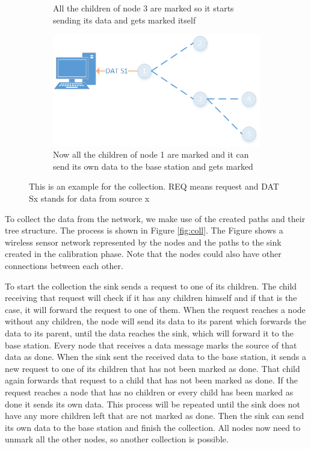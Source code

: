 \begin{figure}[htbp]
\begin{subfigure}[t]{0.4\textwidth}
        \caption{All the children of node 3 are marked so it starts sending its data and gets marked itself}
        \label{fig:coll8}
    \end{subfigure}
    \quad
    \quad
    \begin{subfigure}[t]{0.4\textwidth}
		\centering         
        \includegraphics[scale=0.6]{content/images/Collection/Part9}
        \caption{Now all the children of node 1 are marked and it can send its own data to the base station and gets marked}
        \label{fig:coll9}
    \end{subfigure}
    \caption{This is an example for the collection. REQ means request and DAT Sx stands for data from source x}
\end{figure}

To collect the data from the network, we make use of the created paths and their tree structure. The process is shown in Figure \ref{fig:coll}. The Figure shows a wireless sensor network represented by the nodes and the paths to the sink created in the calibration phase. Note that the nodes could also have other connections between each other. 

To start the collection the sink sends a request to one of its children. The child receiving that request will check if it has any children himself and if that is the case, it will forward the request to one of them. When the request reaches a node without any children, the node will send its data to its parent which forwards the data to its parent, until the data reaches the sink, which will forward it to the base station. Every node that receives a data message marks the source of that data as done. When the sink sent the received data to the base station, it  sends a new request to one of its children that has not been marked as done. That child again forwards that request to a child that has not been marked as done. If the request reaches a node that has no children or every child has been marked as done it sends its own data. This process will be repeated until the sink does not have any more children left that are not marked as done. Then the sink can send its own data to the base station and finish the collection. All nodes now need to unmark all the other nodes, so another collection is possible.

